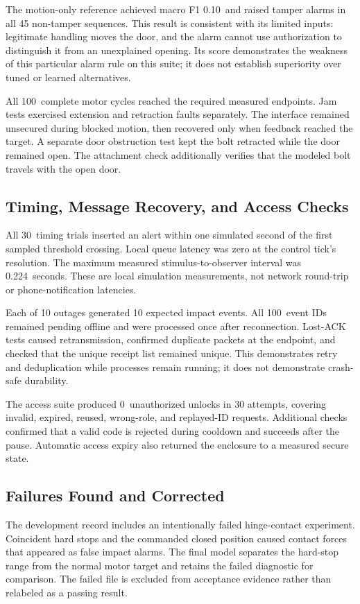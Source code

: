 \documentclass[conference,letterpaper]{IEEEtran}
\newcommand{\Cycles}{100}
\newcommand{\LatencyCount}{30}
\newcommand{\Recovered}{100}
\newcommand{\Unauthorized}{0}
\newcommand{\BaselineF}{0.10}
\newcommand{\ObserverDelay}{0.224}
\begin{document}
The motion-only reference achieved macro F1 \BaselineF\ and raised tamper alarms in all 45 non-tamper sequences. This result is consistent with its limited inputs: legitimate handling moves the door, and the alarm cannot use authorization to distinguish it from an unexplained opening. Its score demonstrates the weakness of this particular alarm rule on this suite; it does not establish superiority over tuned or learned alternatives.

All \Cycles\ complete motor cycles reached the required measured endpoints. Jam tests exercised extension and retraction faults separately. The interface remained unsecured during blocked motion, then recovered only when feedback reached the target. A separate door obstruction test kept the bolt retracted while the door remained open. The attachment check additionally verifies that the modeled bolt travels with the open door.

\subsection{Timing, Message Recovery, and Access Checks}
All \LatencyCount\ timing trials inserted an alert within one simulated second of the first sampled threshold crossing. Local queue latency was zero at the control tick's resolution. The maximum measured stimulus-to-observer interval was \ObserverDelay\ seconds. These are local simulation measurements, not network round-trip or phone-notification latencies.

Each of 10 outages generated 10 expected impact events. All \Recovered\ event IDs remained pending offline and were processed once after reconnection. Lost-ACK tests caused retransmission, confirmed duplicate packets at the endpoint, and checked that the unique receipt list remained unique. This demonstrates retry and deduplication while processes remain running; it does not demonstrate crash-safe durability.

The access suite produced \Unauthorized\ unauthorized unlocks in 30 attempts, covering invalid, expired, reused, wrong-role, and replayed-ID requests. Additional checks confirmed that a valid code is rejected during cooldown and succeeds after the pause. Automatic access expiry also returned the enclosure to a measured secure state.

\subsection{Failures Found and Corrected}
The development record includes an intentionally failed hinge-contact experiment. Coincident hard stops and the commanded closed position caused contact forces that appeared as false impact alarms. The final model separates the hard-stop range from the normal motor target and retains the failed diagnostic for comparison. The failed file is excluded from acceptance evidence rather than relabeled as a passing result.
\end{document}
